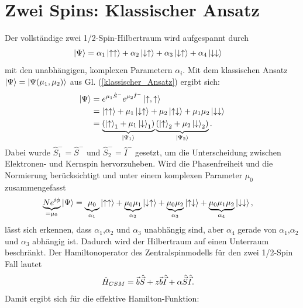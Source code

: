 \section{Zwei Spins: Klassischer Ansatz}
Der vollständige zwei 1/2-Spin-Hilbertraum wird aufgespannt durch
\begin{align}
    \ket{\Psi} &= \alpha_1\ket{\uparrow\uparrow} + \alpha_2 \ket{\downarrow\uparrow} + \alpha_3\ket{\downarrow\uparrow} + \alpha_4\ket{\downarrow\downarrow}
\end{align}
mit den unabhängigen, komplexen Parametern $\alpha_i$.
\noindent Mit dem klassischen Ansatz $\ket{\Psi} = \ket{\Psi(\mu_1, \mu_2)}$ aus Gl. (\ref{klassischer_Ansatz}) ergibt sich: 
\begin{align}
    \ket{\Psi} &= e^{\mu_1 \hat{S}^{-}}e^{\mu_2 \hat{I}^{-}}\ket{\uparrow,\uparrow} \nonumber\\
                &= \ket{\uparrow \uparrow} +\mu_1\ket{\downarrow \uparrow} + \mu_2\ket{\uparrow \downarrow} + \mu_1\mu_2\ket{\downarrow\downarrow}\nonumber\\
                &= \underbrace{\left(\ket{\uparrow}_1 + \mu_1\ket{\downarrow}_1\right)}_{\ket{\Psi_1}}\underbrace{\left(\ket{\uparrow}_2 + \mu_2\ket{\downarrow}_2\right)}_{\ket{\Psi_2}}  .
\end{align}
Dabei wurde $\hat{S}_1^{-} = \hat{S}^{-}$ und $\hat{S}_2^{-} = \hat{I}^{-}$ gesetzt, um die Unterscheidung zwischen Elektronen- und Kernspin hervorzuheben.
Wird die Phasenfreiheit und die Normierung berücksichtigt und unter einem komplexen Parameter $\mu_0$ zusammengefasst
\begin{align}\label{ueberlapp_klassisch}
    \underbrace{Ne^{i\phi}}_{=\mu_0}\ket{\Psi} &= \underbrace{\mu_0}_{\alpha_1}\ket{\uparrow \uparrow} 
    + \underbrace{\mu_0\mu_1}_{\alpha_2}\ket{\downarrow \uparrow} + \underbrace{\mu_0\mu_2}_{\alpha_3}\ket{\uparrow \downarrow} 
    + \underbrace{\mu_0\mu_1\mu_2}_{\alpha_4}\ket{\downarrow\downarrow},
\end{align}
lässt sich erkennen, dass $\alpha_1$,$\alpha_2$ und $\alpha_3$ unabhängig sind, aber $\alpha_4$ gerade 
von $\alpha_1$,$\alpha_2$ und $\alpha_3$ abhängig ist. Dadurch wird der Hilbertraum auf einen Unterraum beschränkt. Der Hamiltonoperator 
des Zentralspinmodells für den zwei 1/2-Spin Fall lautet
\begin{align}\label{zweiSpinHamilton}
    \hat{H}_{CSM} &= \vec{b}\hat{\vec{S}} +  z\vec{b}\hat{\vec{I}} + \alpha \hat{\vec{S}}\hat{\vec{I}}\space.
\end{align}
Damit ergibt sich für die effektive Hamilton-Funktion: 
